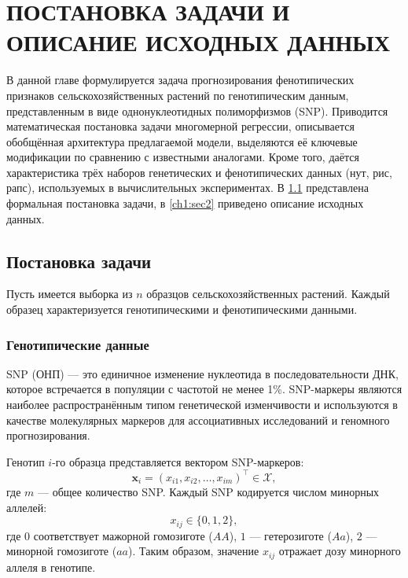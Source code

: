 \chapter{ПОСТАНОВКА ЗАДАЧИ И ОПИСАНИЕ ИСХОДНЫХ ДАННЫХ} \label{ch1}


В данной главе формулируется задача прогнозирования фенотипических 
признаков сельскохозяйственных растений по генотипическим данным, 
представленным в виде однонуклеотидных полиморфизмов (SNP). 
Приводится математическая постановка задачи многомерной регрессии, 
описывается обобщённая архитектура предлагаемой модели, выделяются 
её ключевые модификации по сравнению с известными аналогами. 
Кроме того, даётся характеристика трёх наборов генетических и 
фенотипических данных (нут, рис, рапс), используемых в вычислительных 
экспериментах. В \ref{ch1:sec1} представлена формальная постановка 
задачи, в \ref{ch1:sec2} приведено описание исходных данных.


\section{Постановка задачи}
\label{ch1:sec1}

Пусть имеется выборка из \(n\) образцов сельскохозяйственных растений. 
Каждый образец характеризуется генотипическими и фенотипическими данными.\cite{Lu2015}

\subsection{Генотипические данные}

SNP (ОНП) — это единичное изменение нуклеотида
в последовательности ДНК, которое встречается в популяции с частотой
не менее 1\%. SNP-маркеры являются наиболее распространённым типом
генетической изменчивости и используются в качестве молекулярных
маркеров для ассоциативных исследований и геномного прогнозирования.

Генотип \(i\)-го образца представляется вектором SNP-маркеров:
\[
\mathbf{x}_i = (x_{i1}, x_{i2}, \dots, x_{im})^\top \in \mathcal{X},
\]
где \(m\) — общее количество SNP. Каждый SNP кодируется числом
минорных аллелей:
\[
x_{ij} \in \{0, 1, 2\},
\]
где \(0\) соответствует мажорной гомозиготе (\(AA\)), \(1\) — гетерозиготе
(\(Aa\)), \(2\) — минорной гомозиготе (\(aa\)). Таким образом, значение
\(x_{ij}\) отражает дозу минорного аллеля в генотипе.

